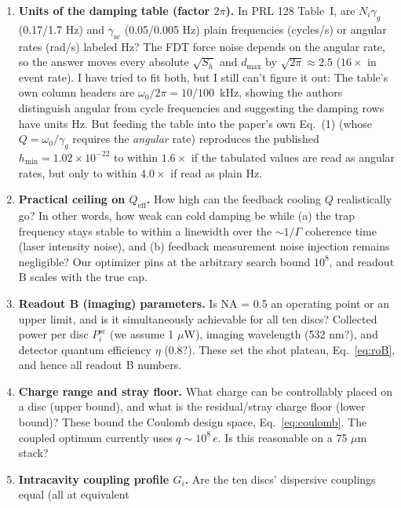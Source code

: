 \documentclass[11pt]{article}
\begin{document}
\begin{enumerate}[label=\textbf{Q\arabic*.},ref=\arabic*,leftmargin=3em]
\item \label{q:2pi} \textbf{Units of the damping table (factor
  $2\pi$).} In PRL 128 Table~I, are $N_i\gamma_g$ (0.17/1.7 Hz) and
  $\gamma_{\mathrm{sc}}$ (0.05/0.005 Hz) plain frequencies (cycles/s)
  or angular rates (rad/s) labeled Hz? The FDT force noise depends on
  the angular rate, so the answer moves every absolute $\sqrt{S_h}$ and
  $d_{\max}$ by $\sqrt{2\pi} \approx 2.5$ ($16\times$ in event rate).
  I have tried to fit both, but I still can't figure it out:
  The table's own
  column headers are $\omega_0/2\pi = 10/100$~kHz, showing the
  authors distinguish angular from cycle frequencies and suggesting the
  damping rows have units Hz.
  But feeding the table into the paper's own Eq.~(1) (whose $Q =
  \omega_0/\gamma_g$ requires the \emph{angular} rate) reproduces the
  published $h_{\min} = 1.02\times10^{-22}$ to within $1.6\times$ if
  the tabulated values are read as angular rates, but only to within
  $4.0\times$ if read as plain Hz. 
\item \label{q:qeff} \textbf{Practical ceiling on $Q_{\mathrm{eff}}$.}
  How high can the feedback cooling $Q$ realistically go? 
  In other words, how
  weak can cold damping be while (a) the trap frequency stays stable to
  within a linewidth over the $\sim 1/\Gamma$ coherence time (laser
  intensity noise), and (b) feedback measurement noise injection
  remains negligible? Our optimizer pins at the arbitrary search bound
  $10^8$, and readout B scales with the true cap.
\item \label{q:B} \textbf{Readout B (imaging) parameters.} Is NA = 0.5
  an operating point or an upper limit, and is it simultaneously
  achievable for all ten discs? Collected power per disc
  $P^{\mathrm{sc}}_i$ (we assume 1 $\mu$W), imaging wavelength (532
  nm?), and detector quantum efficiency $\eta$ (0.8?). These set the
  shot plateau, Eq.~\eqref{eq:roB}, and hence all readout B numbers.
\item \label{q:charge} \textbf{Charge range and stray floor.} What
  charge can be controllably placed on a disc (upper bound), and what
  is the residual/stray charge floor (lower bound)? These bound the
  Coulomb design space, Eq.~\eqref{eq:coulomb}. The coupled optimum
  currently uses $q \sim 10^8\,e$. Is this reasonable on a 75 $\mu$m
  stack?
\item \label{q:gprofile} \textbf{Intracavity coupling profile $G_i$.}
  Are the ten discs' dispersive couplings equal (all at equivalent

\end{enumerate}
\end{document}
